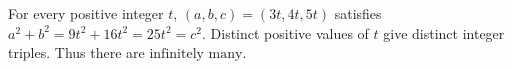 For every positive integer $t$, $(a,b,c)=(3t,4t,5t)$ satisfies $a^2+b^2=9t^2+16t^2=25t^2=c^2$. Distinct positive values of $t$ give distinct integer triples. Thus there are $\boxed{\text{infinitely many}}$.

